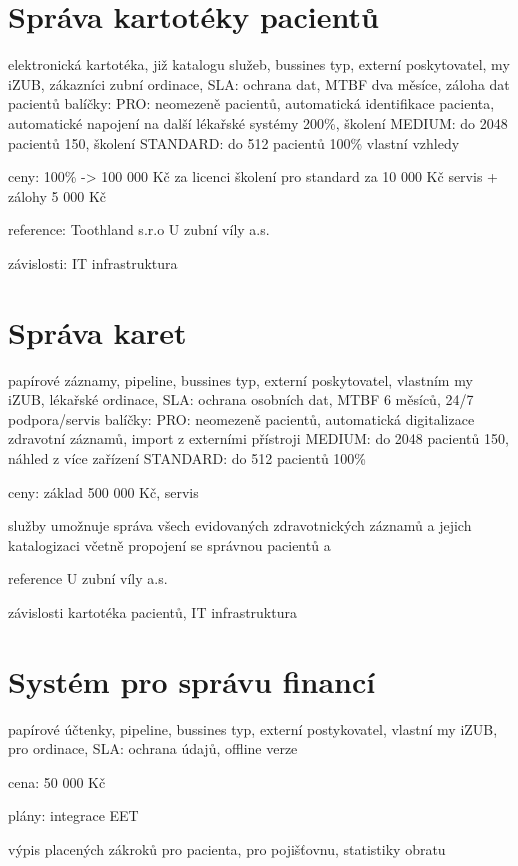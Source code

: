 \documentclass[12pt, a4paper, titlepage]{article}
\begin{document}
	

	\section{Správa kartotéky pacientů}
	elektronická kartotéka, již katalogu služeb, bussines typ, externí poskytovatel,
	my iZUB, zákazníci zubní ordinace, 
	SLA:
		ochrana dat, MTBF dva měsíce, záloha dat pacientů
	balíčky:
		PRO: neomezeně pacientů, automatická identifikace pacienta, automatické napojení na další lékařské systémy 200\%, školení
		MEDIUM: do 2048 pacientů 150, školení
		STANDARD: do 512 pacientů 100\%
		vlastní vzhledy

	ceny:
		100\% -> 100 000 Kč za licenci
		školení pro standard za 10 000 Kč
		servis + zálohy 5 000 Kč

	reference:
		Toothland s.r.o
		U zubní víly a.s.

	závislosti:
		IT infrastruktura


	\section{Správa karet}
	papírové záznamy, pipeline, bussines typ, externí poskytovatel, vlastním my iZUB, lékařské ordinace,
	SLA:
		ochrana osobních dat, MTBF 6 měsíců, 24/7 podpora/servis
	balíčky:
		PRO: neomezeně pacientů, automatická digitalizace zdravotní záznamů, import z externími přístroji 
		MEDIUM: do 2048 pacientů 150, náhled z více zařízení
		STANDARD: do 512 pacientů 100\%

	ceny:
		základ 500 000 Kč,
		servis 

	služby umožnuje správa všech evidovaných zdravotnických záznamů a jejich katalogizaci včetně propojení se správnou pacientů a 

	reference
		U zubní víly a.s.

	závislosti
		kartotéka pacientů, IT infrastruktura

	\section{Systém pro správu financí}
	papírové účtenky, pipeline, bussines typ, externí postykovatel, vlastní my iZUB, pro ordinace,
	SLA:
		ochrana údajů, offline verze

	cena:
		50 000 Kč

	plány:
		integrace EET

	výpis placených zákroků pro pacienta, pro pojišťovnu, statistiky obratu
\end{document}
